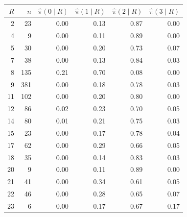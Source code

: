 \begin{tabular}{rrrrrr}
\toprule
$R$ & $n$ & $\hat\pi(0\mid R)$ & $\hat\pi(1\mid R)$ & $\hat\pi(2\mid R)$ & $\hat\pi(3\mid R)$ \\
\midrule
2 & 23 & 0.00 & 0.13 & 0.87 & 0.00 \\
4 & 9 & 0.00 & 0.11 & 0.89 & 0.00 \\
5 & 30 & 0.00 & 0.20 & 0.73 & 0.07 \\
7 & 38 & 0.00 & 0.13 & 0.84 & 0.03 \\
8 & 135 & 0.21 & 0.70 & 0.08 & 0.00 \\
9 & 381 & 0.00 & 0.18 & 0.78 & 0.03 \\
11 & 102 & 0.00 & 0.20 & 0.80 & 0.00 \\
12 & 86 & 0.02 & 0.23 & 0.70 & 0.05 \\
14 & 80 & 0.01 & 0.21 & 0.75 & 0.03 \\
15 & 23 & 0.00 & 0.17 & 0.78 & 0.04 \\
17 & 62 & 0.00 & 0.29 & 0.66 & 0.05 \\
18 & 35 & 0.00 & 0.14 & 0.83 & 0.03 \\
20 & 9 & 0.00 & 0.11 & 0.89 & 0.00 \\
21 & 41 & 0.00 & 0.34 & 0.61 & 0.05 \\
22 & 46 & 0.00 & 0.28 & 0.65 & 0.07 \\
23 & 6 & 0.00 & 0.17 & 0.67 & 0.17 \\
\bottomrule
\end{tabular}
